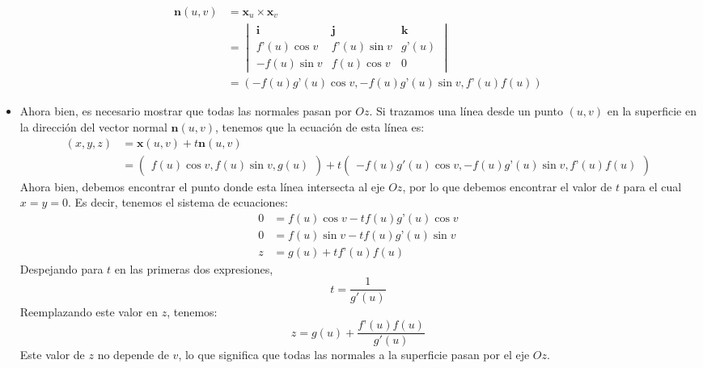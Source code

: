 \begin{problema}
\begin{dem}
\begin{itemize}
        
        \begin{align*}
            \mathbf{n}(u,v) &= \mathbf{x}_u \times \mathbf{x}_v\\
            &= \begin{vmatrix} \mathbf{i} & \mathbf{j} & \mathbf{k} \\ f’(u)\cos v & f’(u)\sin v & g’(u) \\ -f(u)\sin v & f(u)\cos v & 0 \end{vmatrix}\\
            &= (-f(u)g’(u)\cos v,-f(u)g’(u)\sin v,f’(u)f(u))
        \end{align*}
        \item Ahora bien, es necesario mostrar que todas las normales pasan por $Oz$. Si trazamos una línea desde un punto $(u,v)$ en la superficie en la dirección del vector normal $\mathbf{n}(u,v)$, tenemos que la ecuación de esta línea es:
        \begin{align*}
            (x,y,z) &= \mathbf{x}(u,v) + t\mathbf{n}(u,v) \\
            &= \begin{pmatrix}f(u)\cos v , f(u)\sin v , g(u)\end{pmatrix} + t\begin{pmatrix}-f(u)g'(u)\cos v , -f(u)g’(u)\sin v , f’(u)f(u)\end{pmatrix}
        \end{align*}
        Ahora bien,  debemos encontrar el punto donde esta línea intersecta al eje $Oz$, por lo que debemos encontrar el valor de $t$ para el cual $x=y=0$. Es decir, tenemos el sistema de ecuaciones: 
        \begin{align*}
            0 &= f(u)\cos v - tf(u)g’(u)\cos v\\
            0 &= f(u)\sin v - tf(u)g’(u)\sin v\\
            z &= g(u) + tf’(u)f(u)
        \end{align*}
        Despejando para $t$ en las primeras dos expresiones, 
        $$t=\frac{1}{g'(u)}$$
        Reemplazando este valor en $z$, tenemos: 
        $$z = g(u) + \frac{f’(u)f(u)}{g'(u)}$$
        Este valor de $z$ no depende de $v$, lo que significa que todas las normales a la superficie pasan por el eje $Oz$.
    \end{itemize}

\end{dem}
\end{problema}

